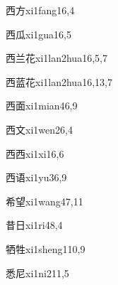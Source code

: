 \begin{verbete}{西方}{xi1fang1}{6,4}
\end{verbete}

\begin{verbete}{西瓜}{xi1gua1}{6,5}
\end{verbete}

\begin{verbete}{西兰花}{xi1lan2hua1}{6,5,7}
\end{verbete}

\begin{verbete}{西蓝花}{xi1lan2hua1}{6,13,7}
\end{verbete}

\begin{verbete}{西面}{xi1mian4}{6,9}
\end{verbete}

\begin{verbete}{西文}{xi1wen2}{6,4}
\end{verbete}

\begin{verbete}{西西}{xi1xi1}{6,6}
\end{verbete}

\begin{verbete}{西语}{xi1yu3}{6,9}
\end{verbete}

\begin{verbete}{希望}{xi1wang4}{7,11}
\end{verbete}

\begin{verbete}{昔日}{xi1ri4}{8,4}
\end{verbete}

\begin{verbete}{牺牲}{xi1sheng1}{10,9}
\end{verbete}

\begin{verbete}{悉尼}{xi1ni2}{11,5}
\end{verbete}

